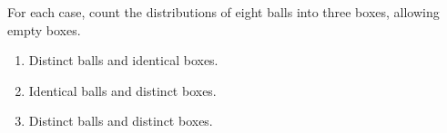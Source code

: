 For each case, count the distributions of eight balls into three boxes, allowing empty boxes.
\begin{enumerate}\item Distinct balls and identical boxes.\item Identical balls and distinct boxes.\item Distinct balls and distinct boxes.\end{enumerate}
